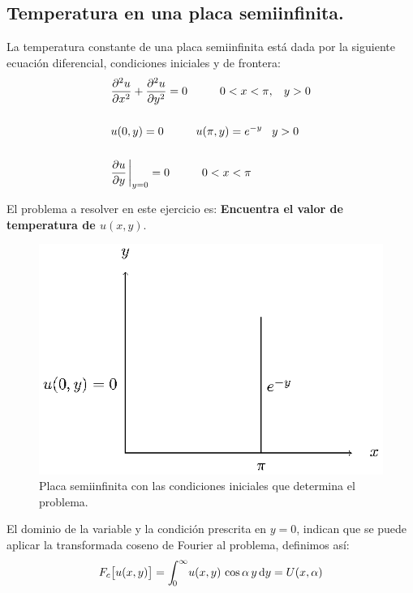 \subsection{Temperatura en una placa semiinfinita.}


La temperatura constante de una placa semiinfinita está dada por la siguiente ecuación diferencial, condiciones iniciales y de frontera:
\begin{align*}
&\pdv[2]{u}{x} + \pdv[2]{u}{y} = 0 \hspace{1cm} 0 < x < \pi, \hspace{0.3cm} y > 0 \\[0.5cm]
&u(0, y) = 0 \hspace{1cm} u(\pi, y) = e^{-y} \hspace{0.3cm} y > 0 \\[0.5cm]
&\pdv{u}{y} \eval_{y=0} = 0 \hspace{1cm} 0 < x < \pi
\end{align*}

El problema a resolver en este ejercicio es: \textbf{Encuentra el valor de temperatura de $u(x,y)$}.

\begin{figure}[H]
    \centering
    \includegraphics[scale=1.3]{Imagenes/Transformada_Fourier_Placa_Ejemplo.eps}
    \caption{Placa semiinfinita con las condiciones iniciales que determina el problema.}
\end{figure}

El dominio de la variable y la condición prescrita en $y = 0$, indican que se puede aplicar la transformada coseno de Fourier al problema, definimos así:
\begin{align*}
F_{c} \big[u(x,y)\big] = \scaleint{5ex}_{\bs 0}^{\infty} u(x, y) \, \cos \alpha \, y \dd{y} = U(x, \alpha)
\end{align*}


